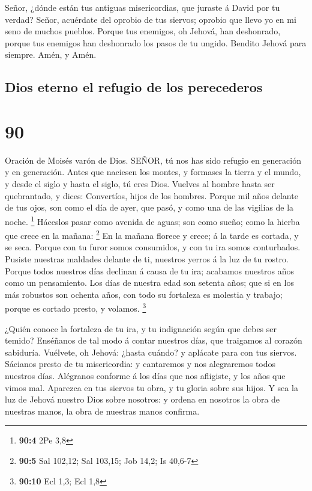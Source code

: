  Señor, ¿dónde están tus antiguas misericordias, que
juraste á David por tu verdad?  Señor, acuérdate del
oprobio de tus siervos; oprobio que llevo yo en mi seno de muchos
pueblos.  Porque tus enemigos, oh Jehová, han deshonrado,
porque tus enemigos han deshonrado los pasos de tu ungido. 
Bendito Jehová para siempre. Amén, y Amén.

\hypertarget{dios-eterno-el-refugio-de-los-perecederos}{%
\subsection{Dios eterno el refugio de los
perecederos}\label{dios-eterno-el-refugio-de-los-perecederos}}

\hypertarget{section-89}{%
\section{90}\label{section-89}}

 Oración de Moisés varón de Dios. SEÑOR, tú nos has sido
refugio en generación y en generación.  Antes que naciesen
los montes, y formases la tierra y el mundo, y desde el siglo y hasta el
siglo, tú eres Dios.  Vuelves al hombre hasta ser
quebrantado, y dices: Convertíos, hijos de los hombres. 
Porque mil años delante de tus ojos, son como el día de ayer, que pasó,
y como una de las vigilias de la noche. \footnote{\textbf{90:4} 2Pe 3,8}
 Háceslos pasar como avenida de aguas; son como sueño; como
la hierba que crece en la mañana: \footnote{\textbf{90:5} Sal 102,12;
  Sal 103,15; Job 14,2; Is 40,6-7}  En la mañana florece y
crece; á la tarde es cortada, y se seca.  Porque con tu
furor somos consumidos, y con tu ira somos conturbados. 
Pusiste nuestras maldades delante de ti, nuestros yerros á la luz de tu
rostro.  Porque todos nuestros días declinan á causa de tu
ira; acabamos nuestros años como un pensamiento.  Los días
de nuestra edad son setenta años; que si en los más robustos son ochenta
años, con todo su fortaleza es molestia y trabajo; porque es cortado
presto, y volamos. \footnote{\textbf{90:10} Ecl 1,3; Ecl 1,8}

 ¿Quién conoce la fortaleza de tu ira, y tu indignación
según que debes ser temido?  Enséñanos de tal modo á contar
nuestros días, que traigamos al corazón sabiduría. 
Vuélvete, oh Jehová: ¿hasta cuándo? y aplácate para con tus siervos.
 Sácianos presto de tu misericordia: y cantaremos y nos
alegraremos todos nuestros días.  Alégranos conforme á los
días que nos afligiste, y los años que vimos mal.  Aparezca
en tus siervos tu obra, y tu gloria sobre sus hijos.  Y sea
la luz de Jehová nuestro Dios sobre nosotros: y ordena en nosotros la
obra de nuestras manos, la obra de nuestras manos confirma.

